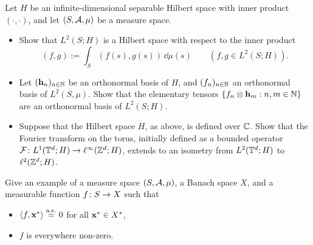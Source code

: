 \begin{exercise}
  Let $H$ be an infinite-dimensional separable Hilbert space with inner product $(\cdot , \cdot)$, and let $(S,\mathcal{A},\mu)$ be a measure space.
  \begin{itemize}
  \item Show that $L^2(S;H)$ is a Hilbert space with respect to the inner product
    \begin{equation*}
      (f, g) := \int_{S} (f(s), g(s)) \, \dd\mu(s) \qquad (f,g \in L^2(S;H)).
    \end{equation*}
  \item Let $(\mathbf{h}_n)_{n \in \mathbb{N}}$ be an orthonormal basis of $H$, and $(f_n)_{n \in \mathbb{N}}$ an orthonormal basis of $L^2(S,\mu)$.
    Show that the elementary tensors $\{f_n \otimes \mathbf{h}_m : n,m \in \mathbb{N}\}$ are an orthonormal basis of $L^2(S;H)$.
  \item Suppose that the Hilbert space $H$, as above, is defined over $\mathbb{C}$.
    Show that the Fourier transform on the torus, initially defined as a bounded operator $\mathcal{F} \colon L^1(\mathbb{T}^d;H) \rightarrow \ell^\infty(\mathbb{Z}^d;H)$, extends to an isometry from $L^2(\mathbb{T}^d;H)$ to $\ell^2(\mathbb{Z}^d;H)$.
  \end{itemize}
\end{exercise}

\begin{exercise}
  Give an example of a measure space $(S, \mathcal{A}, \mu)$, a Banach space $X$, and a measurable function $f \colon S \rightarrow X$ such that
  \begin{itemize}
  \item $\langle f, \mathbf{x}^* \rangle \stackrel{\mathrm{a.e.}}{=} 0$ for all $\mathbf{x}^* \in X^*$,
  \item $f$ is everywhere non-zero.
  \end{itemize}
\end{exercise}


